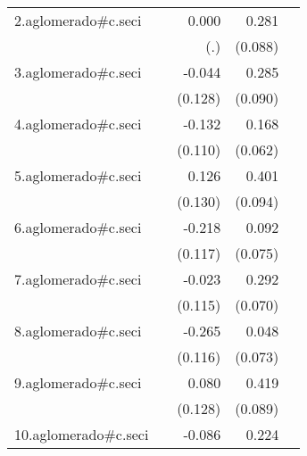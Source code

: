 {\begin{longtable}{l*{4}{D{.}{.}{-1}}}
\addlinespace
2.aglomerado#c.seci&                     &       0.000         &       0.281\sym{**} &                     \\
            &                     &         (.)         &     (0.088)         &                     \\
\addlinespace
3.aglomerado#c.seci&                     &      -0.044         &       0.285\sym{**} &                     \\
            &                     &     (0.128)         &     (0.090)         &                     \\
\addlinespace
4.aglomerado#c.seci&                     &      -0.132         &       0.168\sym{**} &                     \\
            &                     &     (0.110)         &     (0.062)         &                     \\
\addlinespace
5.aglomerado#c.seci&                     &       0.126         &       0.401\sym{***}&                     \\
            &                     &     (0.130)         &     (0.094)         &                     \\
\addlinespace
6.aglomerado#c.seci&                     &      -0.218         &       0.092         &                     \\
            &                     &     (0.117)         &     (0.075)         &                     \\
\addlinespace
7.aglomerado#c.seci&                     &      -0.023         &       0.292\sym{***}&                     \\
            &                     &     (0.115)         &     (0.070)         &                     \\
\addlinespace
8.aglomerado#c.seci&                     &      -0.265\sym{*}  &       0.048         &                     \\
            &                     &     (0.116)         &     (0.073)         &                     \\
\addlinespace
9.aglomerado#c.seci&                     &       0.080         &       0.419\sym{***}&                     \\
            &                     &     (0.128)         &     (0.089)         &                     \\
\addlinespace
10.aglomerado#c.seci&                     &      -0.086         &       0.224\sym{***}&                     \\

\end{longtable}}
